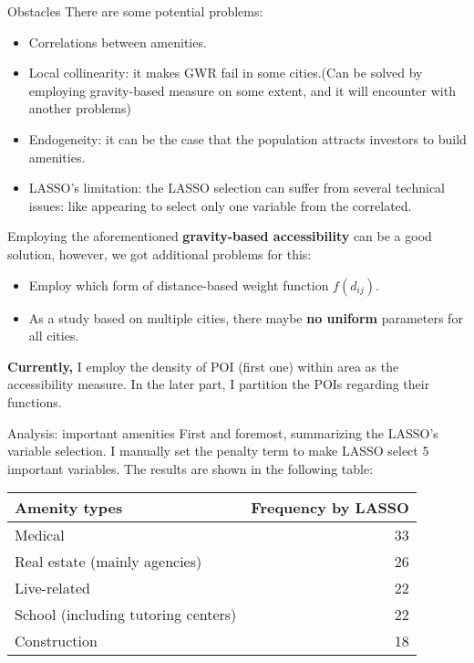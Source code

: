 \documentclass[aspectratio=169,xcolor=dvipsnames]{beamer}
\begin{document}
\begin{frame}{Obstacles}
	There are some potential problems:
	\begin{itemize}
		\item Correlations between amenities.
		\item Local collinearity: it makes GWR fail in some cities.(Can be solved by employing gravity-based measure on some extent, and it will encounter with another problems)
		\item Endogeneity: it can be the case that the population attracts investors to build amenities.
		\item LASSO's limitation: the LASSO selection can suffer from several technical issues: like appearing to select only one variable from the correlated.
	\end{itemize}
	Employing the aforementioned \textbf{gravity-based accessibility} can be a good solution, however, we got additional problems for this:
	\begin{itemize}
	\item Employ which form of distance-based weight function $f(d_{ij})$.
	\item As a study based on multiple cities, there maybe \textbf{no uniform} parameters for all cities.
	\end{itemize}
\end{frame}
\begin{frame}
\textbf{Currently,} I employ the density of POI (first one) within area as the accessibility measure. In the later part, I partition the POIs regarding their functions.
\end{frame}
\begin{frame}{Analysis: important amenities}
First and foremost, summarizing the LASSO's variable selection. I manually set the penalty term to make LASSO select 5 important variables. The results are shown in the following table:
\begin{table}[]
	\begin{tabular}{lr}\toprule
		Amenity types & Frequency by LASSO \\
		\hline 
		Medical       & 33                 \\
		Real estate (mainly agencies)   & 26                 \\
		Live-related  & 22                 \\
		School (including tutoring centers)   & 22                 \\
		Construction  & 18                \\\bottomrule
	\end{tabular}
\end{table}
\end{frame}
\end{document}
